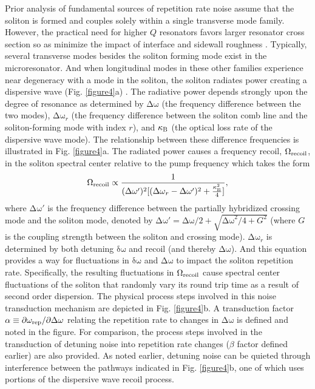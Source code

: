 \documentclass[noshowpacs,amsmath,
twocolumn,
superscriptaddress,
8pt,
aps,prb]{revtex4-2}
\begin{document}
\medskip


\noindent Prior analysis of fundamental sources of repetition rate noise assume that the soliton is formed and couples solely within a single transverse mode family. However, the practical need for higher $Q$ resonators favors larger resonator cross section so as minimize the impact of interface and sidewall roughness \cite{ji2017ultra}. Typically, several transverse modes besides the soliton forming mode exist in the microresonator.  And when longitudinal modes in these other families experience near degeneracy with a mode in the soliton, the soliton radiates power creating a dispersive wave (Fig. \ref{figure4}a) \cite{herr2014mode,yang2016spatial,yi2017single,guo2017intermode}. The radiative power depends strongly upon the degree of resonance as determined by  $\mathrm{\Delta\omega}$ (the frequency difference between the two modes),  $\mathrm{\Delta\omega}_r$ (the frequency difference between the soliton comb line and the soliton-forming mode with index $r$), and $\kappa_{\rm B}$ (the optical loss rate of the dispersive wave mode). The relationship between these difference frequencies is illustrated in Fig. \ref{figure4}a. The radiated power causes a frequency recoil, $\Omega_{\rm recoil}$, in the soliton spectral center relative to the pump frequency which takes the form \cite{yi2017single}
\begin{equation}
    \Omega_{\rm recoil}\propto
    \frac{1}{(\mathrm{\Delta\omega'})^{2}[(\mathrm{\Delta\omega}_r- \mathrm{\Delta\omega'})^{2}+\frac{\kappa_{\rm B}^{2}}{4}]},
    \label{ME}
\end{equation}
where $\mathrm{\Delta\omega'}$ is the frequency difference between the partially hybridized crossing mode and the soliton mode, denoted by $\mathrm{\Delta\omega'}=\mathrm{\Delta\omega}/2+\sqrt{\mathrm{\Delta\omega}^2/4+G^2}$ (where $G$ is the coupling strength between the soliton and crossing mode). $\mathrm{\Delta\omega}_r$ is determined by both detuning $\mathrm{\delta\omega}$ and recoil (and thereby $\mathrm{\Delta\omega}$). And this equation provides a way for fluctuations in $\mathrm{\delta\omega}$ and $\mathrm{\Delta\omega}$ to impact the soliton repetition rate. Specifically, the resulting fluctuations in $ \Omega_{\rm recoil}$ cause spectral center fluctuations of the soliton that randomly vary its round trip time as a result of second order dispersion. 
The physical process steps involved in this noise transduction mechanism are depicted in Fig. \ref{figure4}b.  A transduction factor $\alpha \equiv \partial\omega_{\rm rep}/\partial\mathrm{\Delta\omega}$ relating the repetition rate to changes in $\mathrm{\Delta\omega}$ is defined and noted in the figure. For comparison, the process steps involved in the transduction of detuning noise into repetition rate changes ($\beta$ factor defined earlier) are also provided. As noted earlier, detuning noise can be quieted through interference between the pathways indicated in Fig. \ref{figure4}b, one of which uses portions of the dispersive wave recoil process. 
\end{document}
